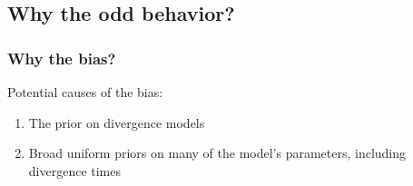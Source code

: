 \subsection{Why the odd behavior?}


\begin{frame}
    \frametitle{Why the bias?}
    Potential causes of the bias:
    \begin{enumerate}
        \item The prior on divergence models
        \item Broad uniform priors on many of the model's parameters, including
            divergence times
    \end{enumerate}
\end{frame}

